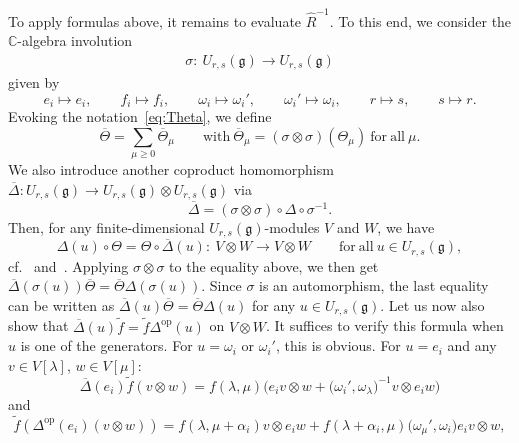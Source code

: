 \documentclass[10pt,a4paper]{amsart}
\numberwithin{equation}{section}
\DeclareMathOperator{\op}{op}
\newcommand{\fg}{\mathfrak{g}}
\newcommand{\BC}{\mathbb{C}}
\newcommand{\uu}{U_{r,s}(\fg)}
\begin{document}
To apply formulas above, it remains to evaluate $\hat{R}^{-1}$. To this end, we consider the $\BC$-algebra involution
\begin{gather}\label{eq:sigma-antiautom}
 \sigma\colon\ \uu \to \uu
\end{gather}
given by
\[
 e_i\mapsto e_i, \qquad f_i\mapsto f_i, \qquad \omega_{i}\mapsto \omega_{i}', \qquad
 \omega_{i}' \mapsto \omega_{i}, \qquad r\mapsto s, \qquad s\mapsto r.
\]
Evoking the notation~\eqref{eq:Theta}, we define
\begin{displaymath}
 \overline{\Theta} = \sum_{\mu\ge 0} \overline{\Theta}_{\mu} \qquad \mathrm{with} \
 \overline{\Theta}_{\mu} = (\sigma \otimes \sigma) (\Theta_{\mu}) \ \mathrm{for\ all} \ \mu.
\end{displaymath}
We also introduce another coproduct homomorphism $\overline{\Delta}\colon \uu \to \uu \otimes \uu$ via
\begin{displaymath}
 \overline{\Delta} = (\sigma \otimes \sigma) \circ \Delta \circ \sigma^{-1}.
\end{displaymath}
Then, for any finite-dimensional $\uu$-modules $V$ and $W$, we have
\begin{displaymath}
 \Delta(u) \circ \Theta = \Theta \circ \overline{\Delta}(u)\colon\ V \otimes W \to V \otimes W
 \qquad \mathrm{for\ all} \ u \in \uu,
\end{displaymath}
cf.\ \cite[Lemma~4.10]{BW1} and~\cite[Lemma~3.3]{BGH2}. Applying $\sigma \otimes \sigma$ to the equality above, we then get $\overline{\Delta}(\sigma(u)) \overline{\Theta} = \overline{\Theta} \Delta(\sigma(u))$. Since $\sigma$ is an automorphism, the last equality can be written as $\overline{\Delta}(u) \overline{\Theta} = \overline{\Theta}\Delta(u)$ for any $u\in \uu$. Let us now also show that $\overline{\Delta}(u) \widetilde{f} = \widetilde{f}\Delta^{\op}(u)$ on $V \otimes W$. It suffices to verify this formula when $u$ is one of the generators. For $u = \omega_{i}$ or $\omega_{i}'$, this is obvious. For $u = e_{i}$ and any $v \in V[\lambda]$, $w \in V[\mu]$:
\begin{displaymath}
 \overline{\Delta}(e_{i}) \widetilde{f} (v \otimes w) =
 f(\lambda,\mu) \bigl(e_{i}v \otimes w + \bigl(\omega_{i}',\omega_{\lambda}\bigr)^{-1} v \otimes e_{i}w\bigr)
\end{displaymath}
and
\begin{displaymath}
 \widetilde{f}(\Delta^{\op}(e_{i})(v \otimes w)) =
 f(\lambda,\mu + \alpha_{i})v \otimes e_{i}w + f(\lambda + \alpha_{i},\mu)\bigl(\omega_{\mu}',\omega_{i}\bigr) e_{i}v \otimes w,
\end{displaymath}
\end{document}
